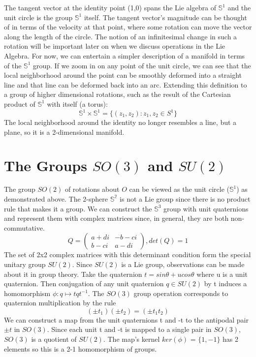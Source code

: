 \documentclass{article}
\begin{document}
The tangent vector at the identity point (1,0) spans the Lie algebra of $\mathbb{S}^1$ and the unit circle is the group $\mathbb{S}^1$ itself. The tangent vector's magnitude can be thought of in terms of the velocity at that point, where some rotation can move the vector along the length of the circle. The notion of an infinitesimal change in such a rotation will be important later on when we discuss operations in the Lie Algebra. For now, we can entertain a simpler description of a manifold in terms of the $\mathbb{S}^1$ group. If we zoom in on any point of the unit circle, we can see that the local neighborhood around the point can be smoothly deformed into a straight line and that line can be deformed back into an arc. Extending this definition to a group of higher dimensional rotations, such as the result of the Cartesian product of $\mathbb{S}^1$ with itself (a torus):
\[
\mathbb{S}^1 \times \mathbb{S}^1 = \{(z_1, z_2) : z_1, z_2 \in S^1 \}
\]
The local neighborhood around the identity no longer resembles a line, but a plane, so it is a 2-dimensional manifold.

\section{The Groups $SO(3)$ and $SU(2)$}
The group $SO(2)$ of rotations about $O$ can be viewed as the unit circle ($\mathbb{S}^1$) as demonstrated above. The 2-sphere $\mathbb{S^2}$ is not a Lie group since there is no product rule that makes it a group. We can construct the $\mathbb{S}^3$ group with unit quaternions and represent them with complex matrices since, in general, they are both non-commutative. \[
Q = \begin{pmatrix}a+di & -b-ci\\b-ci & a-di\end{pmatrix} , det(Q) = 1
\]
The set of 2x2 complex matrices with this determinant condition form the special unitary group $SU(2)$. Since $SU(2)$ is a Lie group, observations can be made about it in group theory.
Take the quaternion $t = sin\theta + ucos\theta$ where u is a unit quaternion. Then conjugation of any unit quaternion $q \in SU(2)$ by t induces a homomorphism $\phi : q \mapsto tqt^{-1}$. The $SO(3)$ group operation corresponds to quaternion multiplication by the rule \[(\pm t_{1})(\pm t_{2}) = (\pm t_{1}t_{2})\]
We can construct a map from the unit quaternions t and -t to the antipodal pair $\pm t$ in $SO(3)$. Since each unit t and -t is mapped to a single pair in $SO(3)$, $SO(3)$ is a quotient of $SU(2)$. The map's kernel $ker(\phi)$ = $\{1,-1\}$ has 2 elements so this is a 2-1 homomorphism of groups.
\end{document}
